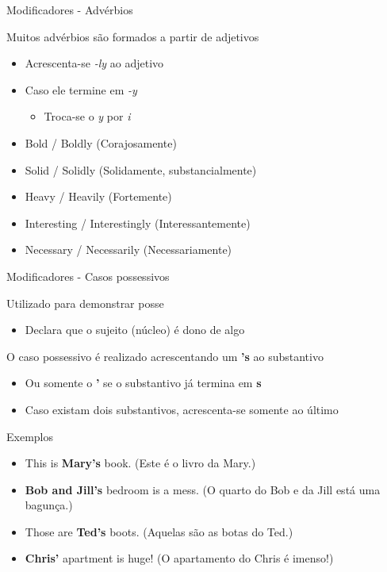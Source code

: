 \documentclass[compress,mathserif,xcolor=table]{beamer}
\begin{document}
\begin{frame}{Modificadores - Advérbios}

Muitos advérbios são formados a partir de adjetivos
\begin{itemize}
    \item Acrescenta-se \textit{-ly} ao adjetivo
    \item Caso ele termine em \textit{-y}
    \begin{itemize}
        \item Troca-se o \textit{y} por \textit{i}
    \end{itemize}
\end{itemize}

\vspace{0.5cm}

\begin{itemize}
    \item Bold / Boldly (Corajosamente)
    \item Solid / Solidly (Solidamente, substancialmente)
    \item Heavy / Heavily (Fortemente)
    \item Interesting / Interestingly (Interessantemente)
    \item Necessary / Necessarily (Necessariamente)
\end{itemize}

\end{frame}


\begin{frame}{Modificadores - Casos possessivos}

Utilizado para demonstrar posse
\begin{itemize}
    \item Declara que o sujeito (núcleo) é dono de algo
\end{itemize}

\vspace{0.25cm}

O caso possessivo é realizado acrescentando um \textbf{'s} ao substantivo
\begin{itemize}
    \item Ou somente o \textbf{'} se o substantivo já termina em \textbf{s}
    \item Caso existam dois substantivos, acrescenta-se somente ao último
\end{itemize}

\vspace{0.25cm}

Exemplos
\begin{itemize}
    \item This is \textbf{Mary’s} book. (Este é o livro da Mary.)
    \item \textbf{Bob and Jill’s} bedroom is a mess. (O quarto do Bob e da Jill está uma bagunça.)
    \item Those are \textbf{Ted’s} boots. (Aquelas são as botas do Ted.)
    \item \textbf{Chris’} apartment is huge! (O apartamento do Chris é imenso!)
\end{itemize}
\end{frame}
\end{document}
